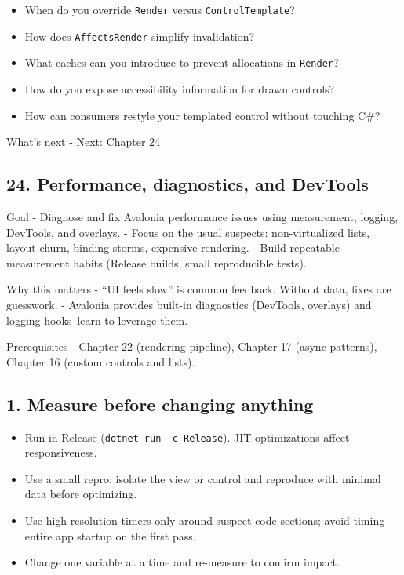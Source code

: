 \begin{itemize}
\tightlist
\item
  When do you override \passthrough{\lstinline!Render!} versus
  \passthrough{\lstinline!ControlTemplate!}?
\item
  How does \passthrough{\lstinline!AffectsRender!} simplify
  invalidation?
\item
  What caches can you introduce to prevent allocations in
  \passthrough{\lstinline!Render!}?
\item
  How do you expose accessibility information for drawn controls?
\item
  How can consumers restyle your templated control without touching C\#?
\end{itemize}

What's next - Next: \href{Chapter24.md}{Chapter 24}

\newpage

\subsection{24. Performance, diagnostics, and
DevTools}\label{performance-diagnostics-and-devtools}

Goal - Diagnose and fix Avalonia performance issues using measurement,
logging, DevTools, and overlays. - Focus on the usual suspects:
non-virtualized lists, layout churn, binding storms, expensive
rendering. - Build repeatable measurement habits (Release builds, small
reproducible tests).

Why this matters - ``UI feels slow'' is common feedback. Without data,
fixes are guesswork. - Avalonia provides built-in diagnostics (DevTools,
overlays) and logging hooks--learn to leverage them.

Prerequisites - Chapter 22 (rendering pipeline), Chapter 17 (async
patterns), Chapter 16 (custom controls and lists).

\subsection{1. Measure before changing
anything}\label{measure-before-changing-anything}

\begin{itemize}
\tightlist
\item
  Run in Release (\passthrough{\lstinline!dotnet run -c Release!}). JIT
  optimizations affect responsiveness.
\item
  Use a small repro: isolate the view or control and reproduce with
  minimal data before optimizing.
\item
  Use high-resolution timers only around suspect code sections; avoid
  timing entire app startup on the first pass.
\item
  Change one variable at a time and re-measure to confirm impact.
\end{itemize}

